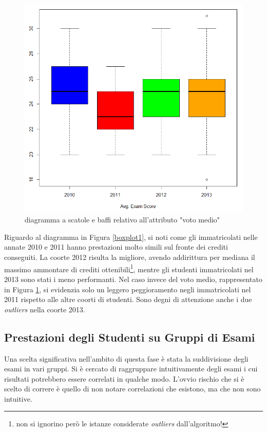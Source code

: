             \begin{figure}
                \centering
                \caption{diagramma a scatole e baffi relativo all'attributo "voto medio"}
                \label{boxplot2}
            	\includegraphics[scale=0.70]{img/box_plot_2.png}
            \end{figure}

            Riguardo al diagramma in Figura \ref{boxplot1}, si noti come gli immatricolati nelle annate 2010 e 2011 hanno prestazioni molto simili sul fronte dei crediti conseguiti. La coorte 2012 risulta la migliore, avendo addirittura per mediana il massimo ammontare di crediti ottenibili\footnote{non si ignorino però le istanze considerate \textit{outliers} dall’algoritmo!}, mentre gli studenti immatricolati nel 2013 sono stati i meno performanti. Nel caso invece del voto medio, rappresentato in Figura \ref{boxplot2}, si evidenzia solo un leggero peggioramento negli immatricolati nel 2011 rispetto alle altre coorti di studenti. Sono degni di attenzione anche i due \textit{outliers} nella coorte 2013.

        \subsection{Prestazioni degli Studenti su Gruppi di Esami}

            Una scelta significativa nell’ambito di questa fase è stata la suddivisione degli esami in vari gruppi. Si è cercato di raggruppare intuitivamente degli esami i cui risultati potrebbero essere correlati in qualche modo. L’ovvio rischio che si è scelto di correre è quello di non notare correlazioni che esistono, ma che non sono intuitive. \\

